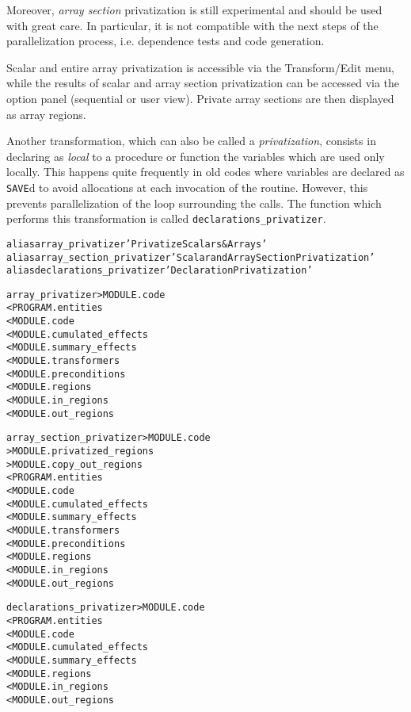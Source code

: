 \documentclass[a4paper]{report}
\newenvironment{PipsMake}{\begin{alltt}}{\end{alltt}}
\begin{document}
Moreover, {\em array section\/} privatization is still experimental and
should be used with great care. In particular, it is not compatible with the
next steps of the parallelization process, i.e. dependence tests and code
generation.

Scalar and entire array privatization is accessible via the Transform/Edit
menu, while the results of scalar and array section privatization can be
accessed via the option panel (sequential or user view). Private array
sections are then displayed as array regions.

Another transformation, which can also be called a \emph{privatization},
consists in declaring as \emph{local} to a procedure or function the
variables which are used only locally. This happens quite frequently in old
codes where variables are declared as {\tt SAVE}d to avoid allocations at
each invocation of the routine. However, this prevents parallelization of
the loop surrounding the calls. The function which performs this
transformation is called \verb|declarations_privatizer|.




\begin{PipsMake}
alias array_privatizer 'Privatize Scalars & Arrays'
alias array_section_privatizer 'Scalar and Array Section Privatization'
alias declarations_privatizer 'Declaration Privatization'
\end{PipsMake}

\begin{PipsMake}
array_privatizer             > MODULE.code
        < PROGRAM.entities
        < MODULE.code
        < MODULE.cumulated_effects
        < MODULE.summary_effects
        < MODULE.transformers
        < MODULE.preconditions
        < MODULE.regions
        < MODULE.in_regions
        < MODULE.out_regions

array_section_privatizer             > MODULE.code
                                     > MODULE.privatized_regions
                                     > MODULE.copy_out_regions
        < PROGRAM.entities
        < MODULE.code
        < MODULE.cumulated_effects
        < MODULE.summary_effects
        < MODULE.transformers
        < MODULE.preconditions
        < MODULE.regions
        < MODULE.in_regions
        < MODULE.out_regions

declarations_privatizer              > MODULE.code
        < PROGRAM.entities
        < MODULE.code
        < MODULE.cumulated_effects
        < MODULE.summary_effects
        < MODULE.regions
        < MODULE.in_regions
        < MODULE.out_regions

\end{PipsMake}
\end{document}
